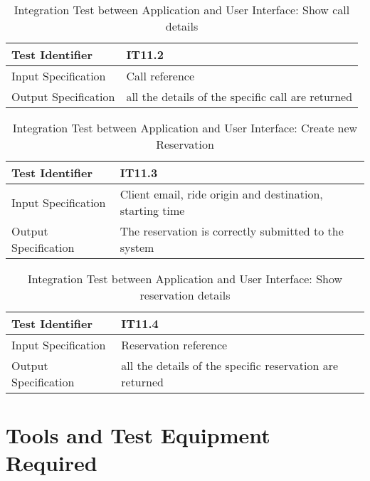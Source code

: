 \documentclass[a4paper]{article}
\begin{document}
\begin{table} [H]
\begin{center}
\begin{tabular}{| L | p{\rightcol} |}
  \hline
  Test Identifier & IT11.2 \\
  \hline
  Input Specification & Call reference\\
  \hline
  Output Specification & all the details of the specific call are returned\\
  \hline
\end{tabular}
\end{center}
\caption{Integration Test between Application and User Interface: Show call details}
\end{table}

\begin{table} [H]
\begin{center}
\begin{tabular}{| L | p{\rightcol} |}
  \hline
  Test Identifier & IT11.3 \\
  \hline
  Input Specification & Client email, ride origin and destination, starting time\\
  \hline
  Output Specification & The reservation is correctly submitted to the system\\
  \hline
\end{tabular}
\end{center}
\caption{Integration Test between Application and User Interface: Create new Reservation}
\end{table}

\begin{table} [H]
\begin{center}
\begin{tabular}{| L | p{\rightcol} |}
  \hline
  Test Identifier & IT11.4 \\
  \hline
  Input Specification & Reservation reference\\
  \hline
  Output Specification & all the details of the specific reservation are returned\\
  \hline
\end{tabular}
\end{center}
\caption{Integration Test between Application and User Interface: Show reservation details}
\end{table}

\section{Tools and Test Equipment Required}
\end{document}

